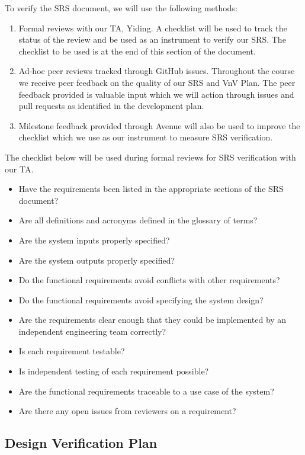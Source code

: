 \documentclass[12pt, titlepage]{article}
\begin{document}
To verify the SRS document, we will use the following methods:
\begin{enumerate}
  \item Formal reviews with our TA, Yiding. A checklist will be used to track
    the status of the review and be used as an instrument to verify our SRS.
    The checklist to be used is at the end of this section of the document.
  \item Ad-hoc peer reviews tracked through GitHub issues. Throughout the
    course we receive peer feedback on the quality of our SRS and VnV Plan. The
    peer feedback provided is valuable input which we will action through issues
    and pull requests as identified in the development plan.
  \item Milestone feedback provided through Avenue will also be used to
    improve the checklist which we use as our instrument to measure
    SRS verification.
\end{enumerate}
The checklist below will be used during formal reviews for SRS verification
with our TA.
\begin{itemize}
  \item Have the requirements been listed in the appropriate sections of the
    SRS document?
  \item Are all definitions and acronyms defined in the glossary of terms?
  \item Are the system inputs properly specified?
  \item Are the system outputs properly specified?
  \item Do the functional requirements avoid conflicts with other requirements?
  \item Do the functional requirements avoid specifying the system design?
  \item Are the requirements clear enough that they could be implemented by an
    independent engineering team correctly?
  \item Is each requirement testable?
  \item Is independent testing of each requirement possible?
  \item Are the functional requirements traceable to a use case of the system?
  \item Are there any open issues from reviewers on a requirement?
\end{itemize}

\subsection{Design Verification Plan}
\end{document}

